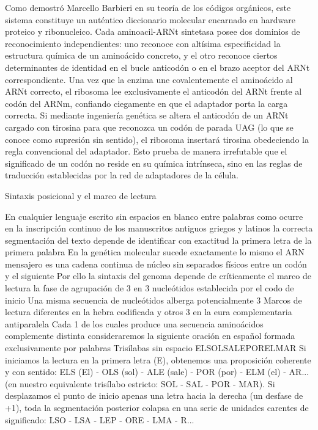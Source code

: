 Como demostró Marcello Barbieri en su teoría de los códigos orgánicos, este sistema constituye un auténtico diccionario molecular encarnado en hardware proteico y ribonucleico. 
Cada aminoacil-ARNt sintetasa posee dos dominios de reconocimiento independientes: uno reconoce con altísima especificidad la estructura química de un aminoácido concreto, y el otro reconoce ciertos determinantes de identidad en el bucle anticodón o en el brazo aceptor del ARNt correspondiente. 
Una vez que la enzima une covalentemente el aminoácido al ARNt correcto, el ribosoma lee exclusivamente el anticodón del ARNt frente al codón del ARNm, confiando ciegamente en que el adaptador porta la carga correcta.
Si mediante ingeniería genética se altera el anticodón de un ARNt cargado con tirosina para que reconozca un codón de parada UAG (lo que se conoce como supresión sin sentido), el ribosoma insertará tirosina obedeciendo la regla convencional del adaptador. 
Esto prueba de manera irrefutable que el significado de un codón no reside en su química intrínseca, sino en las reglas de traducción establecidas por la red de adaptadores de la célula.

Sintaxis posicional y el marco de lectura

En cualquier lenguaje escrito sin espacios en blanco entre palabras como ocurre en la inscripción continuo de los manuscritos antiguos griegos y latinos la correcta segmentación del texto depende de identificar con exactitud la primera letra de la primera palabra 
En la genética molecular sucede exactamente lo mismo el ARN mensajero es una cadena continua de núcleo sin separados físicos entre un codón y el siguiente 
Por ello la sintaxis del genoma depende de críticamente el marco de lectura la fase de agrupación de 3 en 3 nucleótidos establecida por el codo de inicio
Una misma secuencia de nucleótidos alberga potencialmente 3 Marcos de lectura diferentes en la hebra codificada y otros 3 en la eura complementaria antiparalela Cada 1 de los cuales produce una secuencia aminoácidos complemente distinta consideraremos la siguiente oración en español formada exclusivamente por palabras Trisílabas sin espacio
ELSOLSALEPORELMAR
Si iniciamos la lectura en la primera letra (E), obtenemos una proposición coherente y con sentido:
ELS (El) - OLS (sol) - ALE (sale) - POR (por) - ELM (el) - AR... (en nuestro equivalente trisílabo estricto: SOL - SAL - POR - MAR).
Si desplazamos el punto de inicio apenas una letra hacia la derecha (un desfase de +1), toda la segmentación posterior colapsa en una serie de unidades carentes de significado:
LSO - LSA - LEP - ORE - LMA - R...

